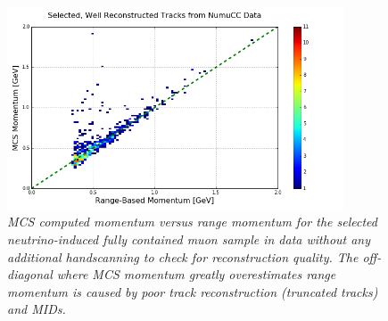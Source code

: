 \begin{figure}[ht!]
\begin{center}
\includegraphics[width=100mm]{Figures/MCS_range_comparison_DataBNBSelectedRecoTrack.png}
\end{center}
\caption{\textit{MCS computed momentum versus range momentum for the selected neutrino-induced fully contained muon sample in data without any additional handscanning to check for reconstruction quality. The off-diagonal where MCS momentum greatly overestimates range momentum is caused by poor track reconstruction (truncated tracks) and MIDs.}}
\label{MCS_range_momentum_DataRecoTrack_nohandscan_fig}
\end{figure}


